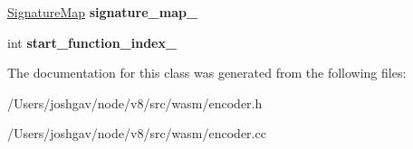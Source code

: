 \begin{DoxyCompactItemize}
\item 
\hyperlink{classv8_1_1internal_1_1_zone_map}{Signature\+Map} {\bfseries signature\+\_\+map\+\_\+}\hypertarget{classv8_1_1internal_1_1wasm_1_1_wasm_module_builder_a8dc04bba8c02889e8ad5897dc1af87f6}{}\label{classv8_1_1internal_1_1wasm_1_1_wasm_module_builder_a8dc04bba8c02889e8ad5897dc1af87f6}

\item 
int {\bfseries start\+\_\+function\+\_\+index\+\_\+}\hypertarget{classv8_1_1internal_1_1wasm_1_1_wasm_module_builder_a67c1fc8b06ba5f3322addda8a0a54090}{}\label{classv8_1_1internal_1_1wasm_1_1_wasm_module_builder_a67c1fc8b06ba5f3322addda8a0a54090}

\end{DoxyCompactItemize}


The documentation for this class was generated from the following files\+:\begin{DoxyCompactItemize}
\item 
/\+Users/joshgav/node/v8/src/wasm/encoder.\+h\item 
/\+Users/joshgav/node/v8/src/wasm/encoder.\+cc\end{DoxyCompactItemize}
